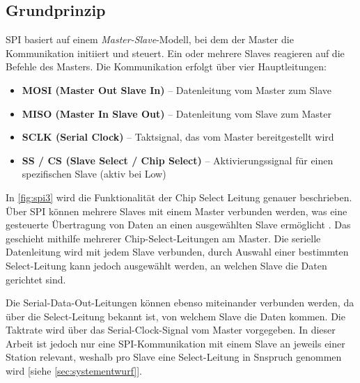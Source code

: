 \subsection*{Grundprinzip}

SPI basiert auf einem \textit{Master-Slave}-Modell, bei dem der Master die Kommunikation initiiert und steuert. Ein oder mehrere Slaves reagieren auf die Befehle des Masters. Die Kommunikation erfolgt über vier Hauptleitungen:

\begin{itemize}
	\item \textbf{MOSI (Master Out Slave In)} – Datenleitung vom Master zum Slave
	\item \textbf{MISO (Master In Slave Out)} – Datenleitung vom Slave zum Master
	\item \textbf{SCLK (Serial Clock)} – Taktsignal, das vom Master bereitgestellt wird
	\item \textbf{SS / CS (Slave Select / Chip Select)} – Aktivierungssignal für einen spezifischen Slave (aktiv bei Low)
\end{itemize}

In \autoref{fig:spi3} wird die Funktionalität der Chip Select Leitung genauer beschrieben. Über SPI können mehrere Slaves mit einem Master verbunden werden, was eine gesteuerte Übertragung von Daten an einen ausgewählten Slave ermöglicht \autocite{mct_spi_2019}. Das geschieht mithilfe mehrerer Chip-Select-Leitungen am Master. Die serielle Datenleitung wird mit jedem Slave verbunden, durch Auswahl einer bestimmten Select-Leitung kann jedoch ausgewählt werden, an welchen Slave die Daten gerichtet sind. 

Die Serial-Data-Out-Leitungen können ebenso miteinander verbunden werden, da über die Select-Leitung bekannt ist, von welchem Slave die Daten kommen. Die Taktrate wird über das Serial-Clock-Signal vom Master vorgegeben. In dieser Arbeit ist jedoch nur eine SPI-Kommunikation mit einem Slave an jeweils einer Station relevant, weshalb pro Slave eine Select-Leitung in Snspruch genommen wird [siehe \autoref{sec:systementwurf}]. 

